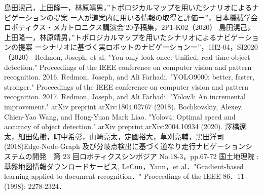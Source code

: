 \documentclass[../main]{subfiles}
\begin{document}
\begin{thebibliography}{9}
 島田滉己，上田隆一，林原靖男，”トポロジカルマップを用いたシナリオによるナビゲーションの提案 ー人が道案内に用いる情報の取得と評価ー”，日本機械学会ロボティクス・メカトロニクス講演会'20予稿集，2P1-K02（2020）
 島田滉己，上田隆一，林原靖男，”トポロジカルマップを用いたシナリオによるナビゲーションの提案 ーシナリオに基づく実ロボットのナビゲーションー”，1H2-04，SI2020（2020）
Redmon, Joseph, et al. "You only look once: Unified, real-time object detection." Proceedings of the IEEE conference on computer vision and pattern recognition. 2016.
Redmon, Joseph, and Ali Farhadi. "YOLO9000: better, faster, stronger." Proceedings of the IEEE conference on computer vision and pattern recognition. 2017.
Redmon, Joseph, and Ali Farhadi. "Yolov3: An incremental improvement." arXiv preprint arXiv:1804.02767 (2018).
Bochkovskiy, Alexey, Chien-Yao Wang, and Hong-Yuan Mark Liao. "Yolov4: Optimal speed and accuracy of object detection." arXiv preprint arXiv:2004.10934 (2020).
澤橋遼太，細田佑樹，町中希彰，山崎亮太，定國裕大，草刈亮輔，黒田洋司(2018)Edge-Node-Graph 及び分岐点検出に基づく道なり走行ナビゲーションシステムの開発　第 23 回ロボティクスシンポジア No.18-3，pp.67-72
国土地理院 : 基盤地図情報ダウンロードサービス, %
 LeCun，Yann，et al．"Gradient-based learning applied to document recognition．" Proceedings of the IEEE 86．11 (1998): 2278-2324．
\end{thebibliography}
\end{document}
